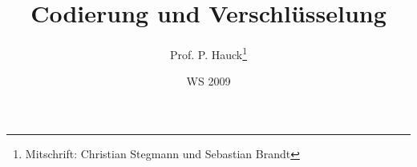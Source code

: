 

\title{Codierung und Verschl\"usselung}
\author{Prof. P. Hauck\thanks{Mitschrift: Christian Stegmann und Sebastian Brandt}}
\date{WS 2009}


	
\maketitle
\tableofcontents
\pagestyle{fancy}
\newpage
\rhead{}
\setcounter{page}{1}			%
\newpage

